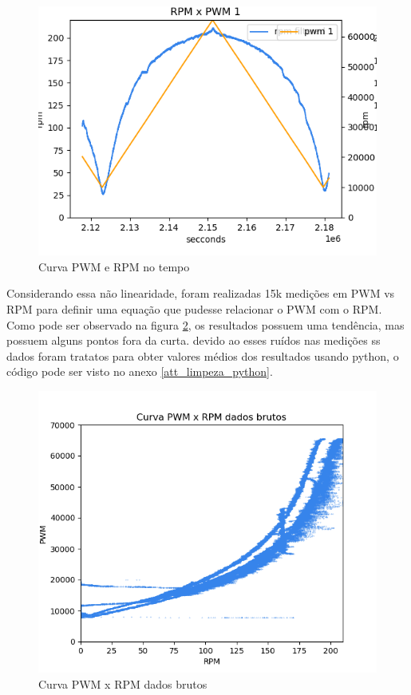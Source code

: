 	\begin{figure}[htb]
		\centering
		\includegraphics{figures/pwm_x_rpm}
		\caption{Curva PWM e RPM no tempo}
		\label{fig:grafico_pwm_x_rpm}
	\end{figure}
	
	Considerando essa não linearidade, foram realizadas 15k medições em PWM vs RPM para definir uma equação que pudesse relacionar o PWM com o RPM.
	Como pode ser observado na figura  \ref{fig:medicao_pwm_x_rpm_dados_brutos}, os resultados possuem uma tendência, mas possuem alguns pontos fora da curta.
	devido ao esses ruídos nas medições ss dados foram tratatos para obter valores médios dos resultados usando python,
	o código pode ser visto no anexo \ref{att_limpeza_python}.
	
	\begin{figure}[htb]
		\centering
		\includegraphics{figures/curva_pwm_x_rpm_dados_brutos}
		\caption{Curva PWM x RPM dados brutos}
		\label{fig:medicao_pwm_x_rpm_dados_brutos}
	\end{figure}
	
